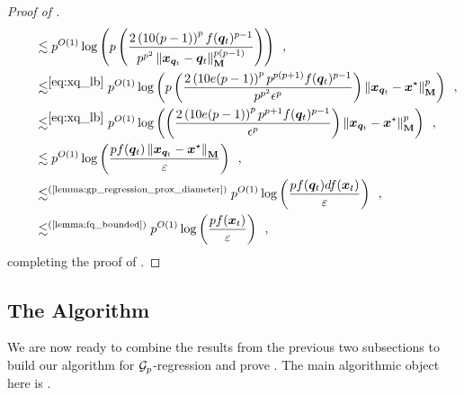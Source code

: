 \begin{proof}[Proof of ]
\begin{align*}
    &\qquad\lesssim p^{O(1)}\logv{ p\inparen{\frac{2\inparen{10(p-1)}^{p}f(\vq_t)^{p-1}}{p^{p^2}\norm{\vx_{\vq_t}-\vq_t}_{\mM}^{p(p-1)}}}}\enspace,\\
    &\qquad\lesssim^{\eqref{eq:xq_lb}} p^{O(1)}\logv{ p\inparen{\frac{2\inparen{10e(p-1)}^{p}p^{p(p+1)}f(\vq_t)^{p-1}}{p^{p^2}\epsilon^p}}\norm{\vx_{\vq_t}-\xstar}_{\mM}^p}\enspace,\\
    &\qquad\lesssim^{\eqref{eq:xq_lb}} p^{O(1)}\logv{\inparen{\frac{2\inparen{10e(p-1)}^{p}p^{p+1}f(\vq_t)^{p-1}}{\epsilon^p}}\norm{\vx_{\vq_t}-\xstar}_{\mM}^p}\enspace,\\
    &\qquad\lesssim p^{O(1)}\logv{\frac{pf(\vq_t)\norm{\vx_{\vq_t}-\xstar}_{\mM}}{\eps}}\enspace,\\
    &\qquad\lesssim^{\text{(\Cref{lemma:gp_regression_prox_diameter})}} p^{O(1)}\logv{\frac{pf(\vq_t)df(\vx_t)}{\eps}}\enspace,\\
    &\qquad\lesssim^{\text{(\Cref{lemma:fq_bounded})}} p^{O(1)}\logv{\frac{pf(\vx_t)}{\eps}}\enspace,
\end{align*}
completing the proof of .
\end{proof}

\subsection{The Algorithm}
\label{sec:gp_interpolating_alg}

We are now ready to combine the results from the previous two subsections to build our algorithm for $\mathcal{G}_p$-regression and prove . The main algorithmic object here is .

